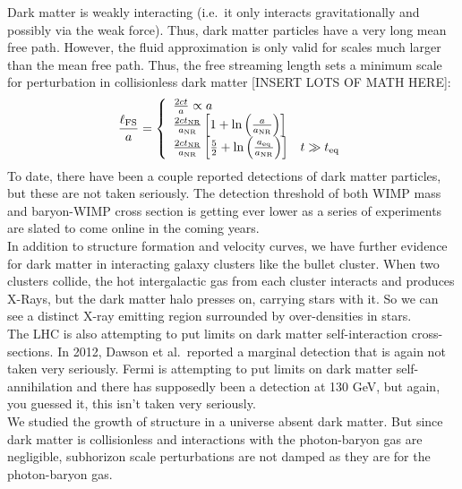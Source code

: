 \documentclass[10pt]{article}
\numberwithin{equation}{section}
\newcommand{\n}{\noindent}
\begin{document}
	\n Dark matter is weakly interacting (i.e.\ it only interacts gravitationally and possibly via the weak force). Thus, dark matter particles have a very long mean free path. However, the fluid approximation is only valid for scales much larger than the mean free path. Thus, the free streaming length sets a minimum scale for perturbation in collisionless dark matter [INSERT LOTS OF MATH HERE]:
	\begin{equation}
		\label{eq:dm:1} \frac{\ell_{\mathrm{FS}}}{a} = \left\{\begin{array}{l l}
			\frac{2ct}{a}\propto a & \\
			\frac{2ct_{\mathrm{NR}}}{a_{\mathrm{NR}}}\left[1+\ln\left(\frac{a}{a_{\mathrm{NR}}}\right)\right] & \\
			\frac{2ct_{\mathrm{NR}}}{a_{\mathrm{NR}}}\left[\frac{5}{2}+\ln\left(\frac{a_{\mathrm{eq}}}{a_{\mathrm{NR}}}\right)\right] & t \gg t_{\mathrm{eq}}
		\end{array}\right.
	\end{equation}
	To date, there have been a couple reported detections of dark matter particles, but these are not taken seriously. The detection threshold of both WIMP mass and baryon-WIMP cross section is getting ever lower as a series of experiments are slated to come online in the coming years.\\
	
	\n In addition to structure formation and velocity curves, we have further evidence for dark matter in interacting galaxy clusters like the bullet cluster. When two clusters collide, the hot intergalactic gas from each cluster interacts and produces X-Rays, but the dark matter halo presses on, carrying stars with it. So we can see a distinct X-ray emitting region surrounded by over-densities in stars.\\
	
	\n The LHC is also attempting to put limits on dark matter self-interaction cross-sections. In 2012, Dawson et al.\ reported a marginal detection that is again not taken very seriously. Fermi is attempting to put limits on dark matter self-annihilation and there has supposedly been a detection at 130 GeV, but again, you guessed it, this isn't taken very seriously.\\
	
	\n We studied the growth of structure in a universe absent dark matter. But since dark matter is collisionless and interactions with the photon-baryon gas are negligible, subhorizon scale perturbations are not damped as they are for the photon-baryon gas.
\end{document}
